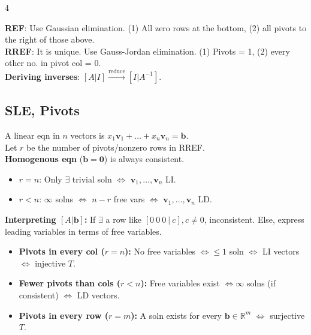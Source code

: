 \documentclass[9pt]{extarticle}
\begin{document}
\begin{multicols*}{4}
\begin{itemize}
\begin{itemize}
    \end{itemize}
\end{itemize}
\textbf{REF}: Use Gaussian elimination. (1) All zero rows at the bottom, (2) all pivots to the right of those above.\\
\textbf{RREF}: It is unique. Use Gauss-Jordan elimination. (1) Pivots = 1, (2) every other no. in pivot col = 0.\\
\textbf{Deriving inverses}: $[A|I] \xrightarrow{\text{reduce}} [I|A^{-1}]$.\\

\subsection*{SLE, Pivots}
A linear eqn in $n$ vectors is $x_{1}\mathbf{v}_{1} + \dots + x_{n}\mathbf{v}_{n} = \mathbf{b}$.\\
Let $r$ be the number of pivots/nonzero rows in RREF.\\
\textbf{Homogenous eqn} ($\mathbf{b} = \mathbf{0}$) is always consistent.
\begin{itemize}
    \item $r = n$: Only $\exists$ trivial soln $\Leftrightarrow$ $\mathbf{v}_{1}, \dots, \mathbf{v}_{n}$ LI.
    \item $r < n$: $\infty$ solns $\Leftrightarrow$ $n-r$ free vars $\Leftrightarrow$ $\mathbf{v}_{1}, \dots, \mathbf{v}_{n}$ LD.
\end{itemize}
\textbf{Interpreting $[A|\mathbf{b}]$:} If $\exists$ a row like $[0\ 0\ 0\ |\ c], c \neq 0$, inconsistent. Else, express leading variables in terms of free variables.
\begin{itemize}
    \item \textbf{Pivots in every col ($r=n$):} No free variables $\Leftrightarrow \le 1$ soln $\Leftrightarrow$ LI vectors $\Leftrightarrow$ injective $T$.
    \item \textbf{Fewer pivots than cols ($r<n$):} Free variables exist $\Leftrightarrow \infty$ solns (if consistent) $\Leftrightarrow$ LD vectors.
    \item \textbf{Pivots in every row ($r=m$):} A soln exists for every $\mathbf{b} \in \mathbb{R}^m$ $\Leftrightarrow$ surjective $T$.
\end{itemize}

\end{multicols*}
\end{document}
